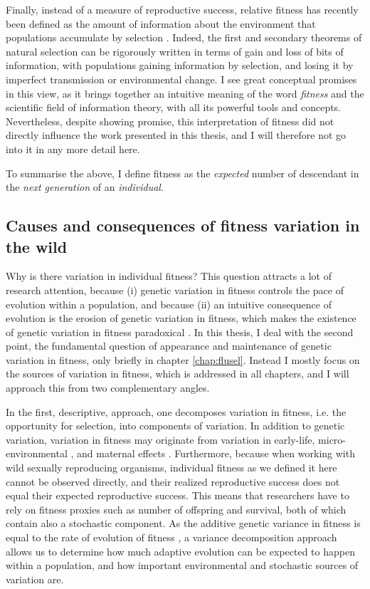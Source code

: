Finally, instead of a measure of reproductive success, relative fitness has recently been defined as the amount of information about the environment that populations accumulate by selection \parencite{Frank2012V}. Indeed, the first and secondary theorems of natural selection can be rigorously written in terms of gain and loss of bits of information, with populations gaining information by selection, and losing it by imperfect transmission or environmental change. 
I see great conceptual promises in this view, as it brings together an intuitive meaning of the word \emph{fitness} and the scientific field of information theory, with all its powerful tools and concepts. Nevertheless, despite showing promise, this interpretation of fitness did not directly influence the work presented in this thesis, and I will therefore not go into it in any more detail here. 


To summarise the above, I define fitness as the \emph{expected} number of descendant in the \emph{next generation} of an \emph{individual}.

\subsection{Causes and consequences of fitness variation in the wild}
Why is there variation in individual fitness? This question attracts a lot of research attention, because (i) genetic variation in fitness controls the pace of evolution within a population, and because (ii) an intuitive consequence of evolution is the erosion of genetic variation in fitness, which makes the existence of genetic variation in fitness paradoxical \parencite{Jones1987}. 
In this thesis, I deal with the second point, the fundamental question of appearance and maintenance of genetic variation in fitness, only briefly in chapter \ref{chap:flusel}. Instead I mostly focus on the sources of variation in fitness, which is addressed in all chapters, and I will approach this from two complementary angles. 

In the first, descriptive, approach, one decomposes variation in fitness, i.e. the opportunity for selection, into components of variation. In addition to genetic variation, variation in fitness may originate from variation in early-life, micro-environmental \parencite{Turner2009}, and maternal effects \parencite{Wolf2009}. Furthermore, because when working with wild sexually reproducing organisms, individual fitness as we defined it here cannot be observed directly, and their realized reproductive success does not equal their expected reproductive success. This means that researchers have to rely on fitness proxies such as number of offspring and survival, both of which contain also a stochastic component. As the additive genetic variance in fitness is equal to the rate of evolution of fitness \parencite{Fisher1930}, a variance decomposition approach allows us to determine how much adaptive evolution can be expected to happen within a population, and how important environmental and stochastic sources of variation are.

